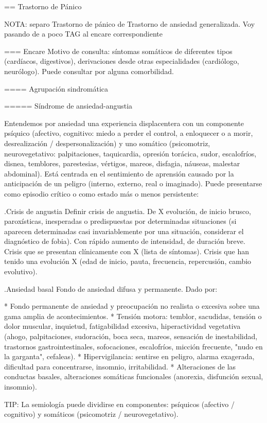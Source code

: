 == Trastorno de Pánico

NOTA: separo Trastorno de pánico de Trastorno de ansiedad generalizada. Voy pasando de a poco TAG al encare correspondiente

=== Encare
Motivo de consulta: síntomas somáticos de diferentes tipos (cardíacos, digestivos), derivaciones desde otras especialidades (cardiólogo, neurólogo). Puede consultar por alguna comorbilidad.

==== Agrupación sindromática

===== Síndrome de ansiedad-angustia

Entendemos por ansiedad una experiencia displacentera con un componente psíquico (afectivo, cognitivo: miedo a perder el control, a enloquecer o a morir, desrealización / despersonalización) y uno somático (psicomotriz, neurovegetativo: palpitaciones, taquicardia, opresión torácica, sudor, escalofríos, disnea, temblores, parestesias, vértigos, mareos, disfagia, náuseas, malestar abdominal). Está centrada en el sentimiento de aprensión causado por la anticipación de un peligro (interno, externo, real o imaginado). Puede presentarse como episodio crítico o como estado más o menos persistente:

.Crisis de angustia
Definir crisis de angustia. De X evolución, de inicio brusco, paroxísticas, inesperadas o predispuestas por determinadas situaciones (si aparecen determinadas casi invariablemente por una situación, considerar el diagnóstico de fobia). Con rápido aumento de intensidad, de duración breve.  Crisis que se presentan clínicamente con X (lista de síntomas). Crisis que han tenido una evolución X (edad de inicio, pauta, frecuencia, repercusión, cambio evolutivo).

.Ansiedad basal
Fondo de ansiedad difusa y permanente. Dado por:

* Fondo permanente de ansiedad y preocupación no realista o excesiva sobre una gama amplia de acontecimientos.
* Tensión motora: temblor, sacudidas, tensión o dolor muscular, inquietud, fatigabilidad excesiva, hiperactividad vegetativa (ahogo, palpitaciones, sudoración, boca seca, mareos, sensación de inestabilidad, trastornos gastrointestinales, sofocaciones, escalofríos, micción frecuente, "nudo en la garganta", cefaleas).
* Hipervigilancia: sentirse en peligro, alarma exagerada, dificultad para concentrarse, insomnio, irritabilidad.
* Alteraciones de las conductas basales, alteraciones somáticas funcionales (anorexia, disfunción sexual, insomnio).

TIP: La semiología puede dividirse en componentes: psíquicos (afectivo / cognitivo) y somáticos (psicomotriz / neurovegetativo).

